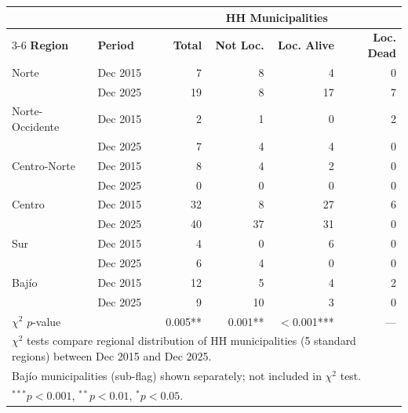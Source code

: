 \begin{tabular}{llrrrr}
  \toprule
  & & \multicolumn{4}{c}{\textbf{HH Municipalities}} \\
  \cmidrule(lr){3-6}
  \textbf{Region} & \textbf{Period} & \textbf{Total} & \textbf{Not Loc.} & \textbf{Loc. Alive} & \textbf{Loc. Dead} \\
  \midrule
  Norte & Dec 2015 & 7 & 8 & 4 & 0 \\
   & Dec 2025 & 19 & 8 & 17 & 7 \\
  \addlinespace[2pt]
  Norte-Occidente & Dec 2015 & 2 & 1 & 0 & 2 \\
   & Dec 2025 & 7 & 4 & 4 & 0 \\
  \addlinespace[2pt]
  Centro-Norte & Dec 2015 & 8 & 4 & 2 & 0 \\
   & Dec 2025 & 0 & 0 & 0 & 0 \\
  \addlinespace[2pt]
  Centro & Dec 2015 & 32 & 8 & 27 & 6 \\
   & Dec 2025 & 40 & 37 & 31 & 0 \\
  \addlinespace[2pt]
  Sur & Dec 2015 & 4 & 0 & 6 & 0 \\
   & Dec 2025 & 6 & 4 & 0 & 0 \\
  \addlinespace[2pt]
  Bajío & Dec 2015 & 12 & 5 & 4 & 2 \\
   & Dec 2025 & 9 & 10 & 3 & 0 \\
  \addlinespace[2pt]
  \midrule
  $\chi^2$ $p$-value &  & 0.005** & 0.001** & $<$0.001*** & --- \\
  \bottomrule
  \multicolumn{6}{l}{\footnotesize $\chi^2$ tests compare regional distribution of HH municipalities (5 standard regions) between Dec 2015 and Dec 2025.} \\
  \multicolumn{6}{l}{\footnotesize Baj\'{i}o municipalities (sub-flag) shown separately; not included in $\chi^2$ test.} \\
  \multicolumn{6}{l}{\footnotesize $^{***}p<0.001$, $^{**}p<0.01$, $^{*}p<0.05$.} \\
\end{tabular}